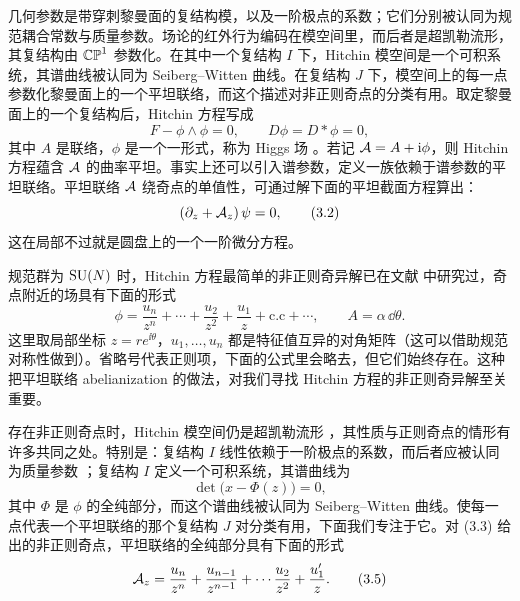 几何参数是带穿刺黎曼面的复结构模，以及一阶极点的系数；它们分别被认同为规范耦合常数与质量参数。场论的红外行为编码在模空间里，而后者是超凯勒流形，其复结构由 $\mathbb{CP}^1$ 参数化。在其中一个复结构 $I$ 下，Hitchin 模空间是一个可积系统，其谱曲线被认同为 Seiberg--Witten 曲线。在复结构 $J$ 下，模空间上的每一点参数化黎曼面上的一个平坦联络，而这个描述对非正则奇点的分类有用。取定黎曼面上的一个复结构后，Hitchin 方程写成
\begin{equation}
F - \phi\wedge\phi = 0,\qquad D\phi = D\ast\phi = 0,
\label{eq:3.1}\tag{3.1}
\end{equation}
其中 $A$ 是联络，$\phi$ 是一个一形式，称为 Higgs 场 \cite{8,25}。若记 $\mathcal{A} = A + \mathrm{i}\phi$，则 Hitchin 方程蕴含 $\mathcal{A}$ 的曲率平坦。事实上还可以引入谱参数，定义一族依赖于谱参数的平坦联络。平坦联络 $\mathcal{A}$ 绕奇点的单值性，可通过解下面的平坦截面方程算出：
\begin{equation}
(\partial_z + \mathcal{A}_z)\,\psi = 0,
\label{eq:3.2}\tag{3.2}
\end{equation}
这在局部不过就是圆盘上的一个一阶微分方程。

规范群为 $\operatorname{SU}(N)$ 时，Hitchin 方程最简单的非正则奇异解已在文献 \cite{26} 中研究过，奇点附近的场具有下面的形式
\begin{equation}
\phi = \frac{u_n}{z^n} + \cdots + \frac{u_2}{z^2} + \frac{u_1}{z} + \text{c.c} + \cdots,\qquad
A = \alpha\,\dd\theta .
\label{eq:3.3}\tag{3.3}
\end{equation}
这里取局部坐标 $z = re^{\ii\theta}$，$u_1,\dots,u_n$ 都是特征值互异的对角矩阵（这可以借助规范对称性做到）。省略号代表正则项，下面的公式里会略去，但它们始终存在。这种把平坦联络 abelianization 的做法，对我们寻找 Hitchin 方程的非正则奇异解至关重要。


存在非正则奇点时，Hitchin 模空间仍是超凯勒流形 \cite{10}，其性质与正则奇点的情形有许多共同之处。特别是：复结构 $I$ 线性依赖于一阶极点的系数，而后者应被认同为质量参数 \cite{26}；复结构 $I$ 定义一个可积系统，其谱曲线为
\begin{equation}
\det\bigl(x - \Phi(z)\bigr) = 0,
\label{eq:3.4}\tag{3.4}
\end{equation}
其中 $\Phi$ 是 $\phi$ 的全纯部分，而这个谱曲线被认同为 Seiberg--Witten 曲线。使每一点代表一个平坦联络的那个复结构 $J$ 对分类有用，下面我们专注于它。对 (3.3) 给出的非正则奇点，平坦联络的全纯部分具有下面的形式
\begin{equation}
\mathcal{A}_z = \frac{u_n}{z^n} + \frac{u_{n-1}}{z^{n-1}} + \cdots \frac{u_2}{z^2} + \frac{u'_1}{z}.
\label{eq:3.5}\tag{3.5}
\end{equation}

